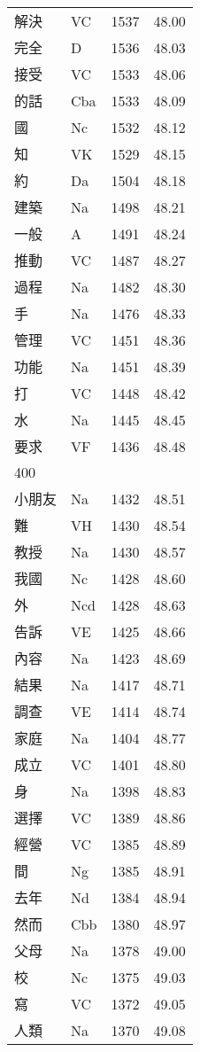 \documentclass[twocolumn]{book}
\begin{document}
\begin{supertabular}{llrr}
解決 & VC & 1537 &  48.00\\
完全 & D & 1536 &  48.03\\
接受 & VC & 1533 &  48.06\\
的話 & Cba & 1533 &  48.09\\
國 & Nc & 1532 &  48.12\\
知 & VK & 1529 &  48.15\\
約 & Da & 1504 &  48.18\\
建築 & Na & 1498 &  48.21\\
一般 & A & 1491 &  48.24\\
推動 & VC & 1487 &  48.27\\
過程 & Na & 1482 &  48.30\\
手 & Na & 1476 &  48.33\\
管理 & VC & 1451 &  48.36\\
功能 & Na & 1451 &  48.39\\
打 & VC & 1448 &  48.42\\
水 & Na & 1445 &  48.45\\
要求 & VF & 1436 &  48.48\\
400\\
小朋友 & Na & 1432 &  48.51\\
難 & VH & 1430 &  48.54\\
教授 & Na & 1430 &  48.57\\
我國 & Nc & 1428 &  48.60\\
外 & Ncd & 1428 &  48.63\\
告訴 & VE & 1425 &  48.66\\
內容 & Na & 1423 &  48.69\\
結果 & Na & 1417 &  48.71\\
調查 & VE & 1414 &  48.74\\
家庭 & Na & 1404 &  48.77\\
成立 & VC & 1401 &  48.80\\
身 & Na & 1398 &  48.83\\
選擇 & VC & 1389 &  48.86\\
經營 & VC & 1385 &  48.89\\
間 & Ng & 1385 &  48.91\\
去年 & Nd & 1384 &  48.94\\
然而 & Cbb & 1380 &  48.97\\
父母 & Na & 1378 &  49.00\\
校 & Nc & 1375 &  49.03\\
寫 & VC & 1372 &  49.05\\
人類 & Na & 1370 &  49.08\\

\end{supertabular}
\end{document}
